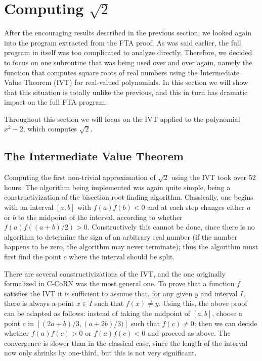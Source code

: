 \documentclass{entcs}
\begin{document}
\section{\texorpdfstring{Computing $\sqrt{2}$}{Computing sqrt(2)}}\label{sqrt2}

After the encouraging results described in the previous section, we
looked again into the program extracted from the FTA proof.
As was said earlier, the full program in itself was too complicated to
analyze directly.  Therefore, we decided to focus on one subroutine
that was being used over and over again, namely the function that computes
square roots of real numbers
using the Intermediate Value Theorem (IVT) for real-valued polynomials.
In this section we will show that this situation is totally unlike the
previous, and this in turn has dramatic impact on the full FTA program.

Throughout this section we will focus on the IVT applied to the polynomial
$x^2-2$, which computes $\sqrt2$.

\subsection{The Intermediate Value Theorem}

Computing the first non-trivial approximation of $\sqrt2$ using the IVT
took over 52 hours.
The algorithm being implemented was again quite simple, being
a constructivization of the bisection root-finding algorithm.
Classically, one begins with an interval $[a,b]$ with $f(a)f(b)<0$ and
at each step changes either $a$ or $b$ to the midpoint of the interval,
according to whether $f(a)f((a+b)/2)>0$.  Constructively
this cannot be done, since there is no algorithm to determine the sign of
an arbitrary real number (if the number happens to be zero, the
algorithm may never terminate);
thus the algorithm must first find
the point $c$ where the interval should be split.

There are several constructivizations of the IVT, and the one originally
formalized in C-CoRN was the most general one.  To prove that a function
$f$ satisfies the IVT it is sufficient to assume that, for any given $y$
and interval $I$, there is always a point $x\in I$ such that $f(x)\neq y$.
Using this, the above proof can be adapted as follows: instead
of taking the midpoint of $[a,b]$, choose a point $c$ in
$[(2a+b)/3,(a+2b)/3)]$ such that $f(c)\neq0$; then we can decide whether
$f(a)f(c)>0$ or $f(a)f(c)<0$ and proceed as above.  The convergence is 
slower than
in the classical case, since the length of the interval now only shrinks
by one-third, but this is not very significant.
\end{document}
